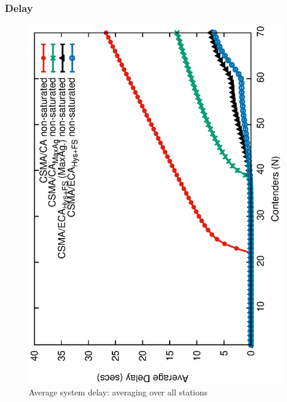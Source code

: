 	
	\subsubsection{Delay}
	
	\begin{figure}[tb]
		\centering
		\includegraphics[width=0.7\linewidth,angle=-90]{figures/unsaturated/queueingDelay/queueingDelay-TON.eps}
		\caption{Average system delay: averaging over all stations}
		\label{fig:serviceTime-unsat}
	\end{figure}
	
